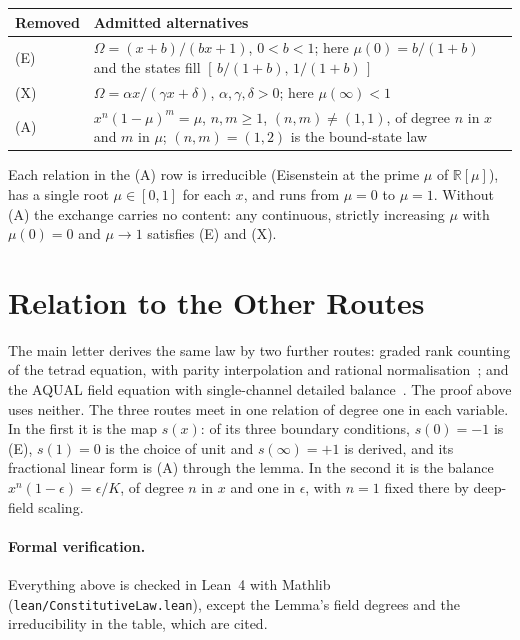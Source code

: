 \documentclass[twocolumn]{iopjournal}
\begin{document}
\vspace{6pt}
\noindent
\begin{tabular*}{\columnwidth}{@{\extracolsep{\fill}}lp{}@{}}
\hline
Removed & Admitted alternatives \\
\hline
(E) & $\Omega = (x+b)/(bx+1)$, $0 < b < 1$; here $\mu(0) = b/(1+b)$
  and the states fill $[\,b/(1+b),\,1/(1+b)\,]$ \\
(X) & $\Omega = \alpha x/(\gamma x + \delta)$, $\alpha, \gamma,
  \delta > 0$; here $\mu(\infty) < 1$ \\
(A) & $x^n(1-\mu)^m = \mu$, $n, m \ge 1$, $(n,m) \neq (1,1)$, of
  degree $n$ in $x$ and $m$ in $\mu$; $(n,m) = (1,2)$ is the
  bound-state law~\cite{Nelson2026bound} \\
\hline
\end{tabular*}
\vspace{6pt}

Each relation in the (A) row is irreducible (Eisenstein at the prime
$\mu$ of $\mathbb{R}[\mu]$), has a single root
$\mu \in [0,1]$ for each $x$, and runs from $\mu = 0$ to $\mu = 1$.
Without (A) the exchange carries no content: any continuous,
strictly increasing $\mu$ with $\mu(0) = 0$ and $\mu \to 1$
satisfies (E) and (X).


\section*{Relation to the Other Routes}

The main letter derives the same law by two further routes: graded
rank counting of the tetrad equation, with parity interpolation and
rational normalisation~\cite{Nelson2026metric}; and the AQUAL field
equation with single-channel detailed
balance~\cite{Nelson2026equilibrium}. The proof above uses neither.
The three routes meet in
one relation of degree one in each variable. In the first it is the
map $s(x)$: of its three boundary conditions, $s(0) = -1$ is (E),
$s(1) = 0$ is the choice of unit and $s(\infty) = +1$ is derived,
and its fractional linear form is (A) through the lemma. In the
second it is the balance $x^n(1-\epsilon) = \epsilon/K$, of degree
$n$ in $x$ and one in $\epsilon$, with $n = 1$ fixed there by
deep-field scaling.


\paragraph{Formal verification.} Everything above is checked in Lean~4
with Mathlib (\texttt{lean/ConstitutiveLaw.lean}), except the Lemma's
field degrees and the irreducibility in the table, which are cited.
\end{document}
